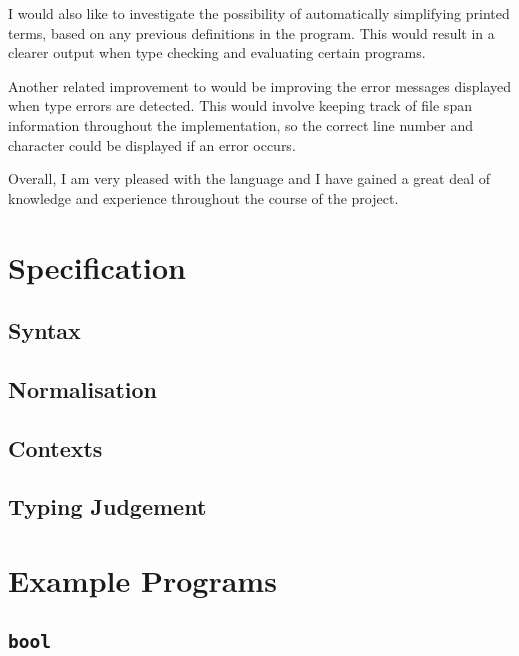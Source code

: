\documentclass[12pt,a4paper,twoside]{report}
\begin{document}
I would also like to investigate the possibility of automatically simplifying printed terms, based on any previous definitions in the program.
This would result in a clearer output when type checking and evaluating certain programs.

Another related improvement to \pimu{} would be improving the error messages displayed when type errors are detected.
This would involve keeping track of file span information throughout the implementation, so the correct line number and character could be displayed if an error occurs.

Overall, I am very pleased with the \pimu{} language and I have gained a great deal of knowledge and experience throughout the course of the project.

\clearpage
{}



\appendix

\chapter{\pimu{} Specification}
\label{app:spec}

\section{Syntax}
\syntax{}

\section{Normalisation}
\norm{}

\section{Contexts}
\ctxsyntax{}

\ctxvalidity{}

\section{Typing Judgement}

\chapter{Example Programs}

\section{\texttt{bool}}

\end{document}
